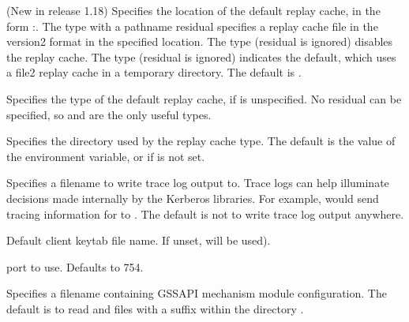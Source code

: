 \documentclass[letterpaper,10pt,english]{sphinxmanual}
\begin{document}
\begin{description}
\sphinxAtStartPar
(New in release 1.18) Specifies the location of the default replay
cache, in the form :.  The  type with a
pathname residual specifies a replay cache file in the version\sphinxhyphen{}2
format in the specified location.  The  type (residual is
ignored) disables the replay cache.  The  type (residual is
ignored) indicates the default, which uses a file2 replay cache in
a temporary directory.  The default is .

\sphinxAtStartPar
Specifies the type of the default replay cache, if
 is unspecified.  No residual can be specified,
so  and  are the only useful types.

\sphinxAtStartPar
Specifies the directory used by the  replay cache type.
The default is the value of the  environment variable,
or  if  is not set.

\sphinxAtStartPar
Specifies a filename to write trace log output to.  Trace logs can
help illuminate decisions made internally by the Kerberos
libraries.  For example, 
would send tracing information for {\hyperref[\detokenize{user/user_commands/kinit:kinit-1}]{}} to
.  The default is not to write trace log output
anywhere.

\sphinxAtStartPar
Default client keytab file name.  If unset,  will be
used).

\sphinxAtStartPar
{} port to use.  Defaults to 754.

\sphinxAtStartPar
Specifies a filename containing GSSAPI mechanism module
configuration.  The default is to read 
and files with a  suffix within the directory
.

\end{description}
\end{document}
